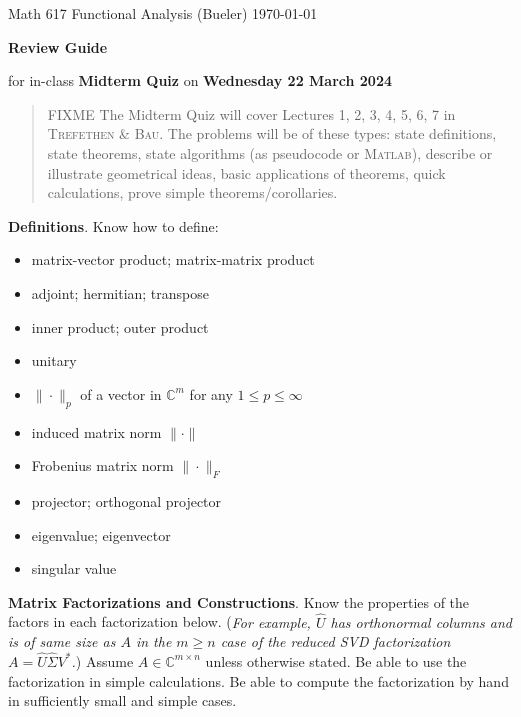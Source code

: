 \documentclass[11pt]{amsart}
\newcommand{\normalspacing}{\renewcommand{\baselinestretch}{1.1}\tiny\normalsize}
\newcommand{\bigspacing}{\renewcommand{\baselinestretch}{1.21}\tiny\normalsize}
\newcommand{\CC}{{\mathbb{C}}}
\newcommand{\Matlab}{\textsc{Matlab}\xspace}
\newcommand{\textbook}{\textsc{Trefethen \& Bau}}
\begin{document}
\scriptsize \noindent Math 617 Functional Analysis (Bueler) \hfill \today
\thispagestyle{empty}

\bigskip
\LARGE\centerline{\textbf{Review Guide}}

\medskip
\Large\centerline{for in-class \textbf{Midterm Quiz} on \textbf{Wednesday 22 March 2024}}

\normalsize
\bigskip
\begin{quote}
FIXME The Midterm Quiz will cover Lectures 1, 2, 3, 4, 5, 6, 7 in \textbook.  The problems will be of these types: state definitions, state theorems, state algorithms (as pseudocode or \Matlab), describe or illustrate geometrical ideas, basic applications of theorems, quick calculations, prove simple theorems/corollaries.
\end{quote}
\bigskip

\bigspacing
\noindent \textbf{Definitions}. Know how to define:
\begin{itemize}
\item matrix-vector product; matrix-matrix product
\item adjoint; hermitian; transpose
\item inner product; outer product
\item unitary
\item $\|\cdot\|_p$ of a vector in $\CC^m$ for any $1\le p \le \infty$
\item induced matrix norm $\|\cdot\|$
\item Frobenius matrix norm $\|\cdot\|_F$
\item projector; orthogonal projector
\item eigenvalue; eigenvector
\item singular value
\end{itemize}

\normalspacing

\medskip\noindent \textbf{Matrix Factorizations and Constructions}.  Know the properties of the factors in each factorization below.  (\emph{For example, $\hat U$ has orthonormal columns and is of same size as $A$ in the $m\ge n$ case of the reduced SVD factorization $A=\hat U \hat \Sigma V^*$.})  Assume $A\in \CC^{m\times n}$ unless otherwise stated.  Be able to use the factorization in simple calculations.  Be able to compute the factorization by hand in sufficiently small and simple cases.
\end{document}
